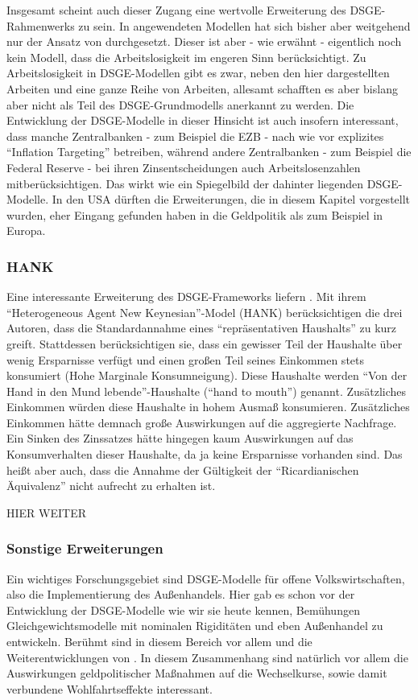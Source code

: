 Insgesamt scheint auch dieser Zugang eine wertvolle Erweiterung des DSGE-Rahmenwerks zu sein. In angewendeten Modellen hat sich bisher aber weitgehend nur der Ansatz von \textcite{Erceg2000} durchgesetzt. Dieser ist aber - wie erwähnt - eigentlich noch kein Modell, dass die Arbeitslosigkeit im engeren Sinn berücksichtigt. Zu Arbeitslosigkeit in DSGE-Modellen gibt es zwar, neben den hier dargestellten Arbeiten \textcite{Gali2011a, Gali2011b} und \textcite{Blanchard2010} eine ganze Reihe von Arbeiten, allesamt schafften es aber bislang aber nicht als Teil des DSGE-Grundmodells anerkannt zu werden. Die Entwicklung der DSGE-Modelle in dieser Hinsicht ist auch insofern interessant, dass manche Zentralbanken - zum Beispiel die EZB - nach wie vor explizites "`Inflation Targeting"' betreiben, während andere Zentralbanken - zum Beispiel die Federal Reserve - bei ihren Zinsentscheidungen auch Arbeitslosenzahlen mitberücksichtigen. Das wirkt wie ein Spiegelbild der dahinter liegenden DSGE-Modelle. In den USA dürften die Erweiterungen, die in diesem Kapitel vorgestellt wurden, eher Eingang gefunden haben in die Geldpolitik als zum Beispiel in Europa.

\subsubsection{HANK}
Eine interessante Erweiterung des DSGE-Frameworks liefern \textcite{Kaplan2018}. Mit ihrem "`Heterogeneous Agent New Keynesian"'-Model (HANK) berücksichtigen die drei Autoren, dass die Standardannahme eines "`repräsentativen Haushalts"' zu kurz greift. Stattdessen berücksichtigen sie, dass ein gewisser Teil der Haushalte über wenig Ersparnisse verfügt und einen großen Teil seines Einkommen stets konsumiert (Hohe Marginale Konsumneigung). Diese Haushalte werden "`Von der Hand in den Mund lebende"'-Haushalte ("`hand to mouth"') genannt. Zusätzliches Einkommen würden diese Haushalte in hohem Ausmaß konsumieren. Zusätzliches Einkommen hätte demnach große Auswirkungen auf die aggregierte Nachfrage. Ein Sinken des Zinssatzes hätte hingegen kaum Auswirkungen auf das Konsumverhalten dieser Haushalte, da ja keine Ersparnisse vorhanden sind. Das heißt aber auch, dass die Annahme der Gültigkeit der "`Ricardianischen Äquivalenz"' nicht aufrecht zu erhalten ist.

HIER WEITER



\subsubsection{Sonstige Erweiterungen}
Ein wichtiges Forschungsgebiet sind DSGE-Modelle für offene Volkswirtschaften, also die Implementierung des Außenhandels. Hier gab es schon vor der Entwicklung der DSGE-Modelle wie wir sie heute kennen, Bemühungen Gleichgewichtsmodelle mit nominalen Rigiditäten und eben Außenhandel zu entwickeln. Berühmt sind in diesem Bereich vor allem \textcite{Obstfeld1995, Obstfeld2002} und die Weiterentwicklungen von \textcite{Corsetti2001}. In diesem Zusammenhang sind natürlich vor allem die Auswirkungen geldpolitischer Maßnahmen auf die Wechselkurse, sowie damit verbundene Wohlfahrtseffekte interessant.

